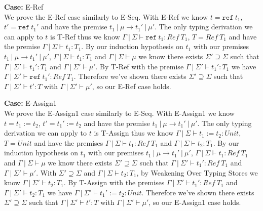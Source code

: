 \documentclass[12pt, fleqn]{article}
\begin{document}
\medskip
\textbf{Case:} E-Ref\\
We prove the E-Ref case similarly to E-Seq. With E-Ref we know $t = \texttt{ref}\:t_1$, $t' = \texttt{ref}\:t_1'$ and have the premise $t_1\:|\:\mu \rightarrow t_1'\:|\:\mu'$. The only typing derivation we can apply to $t$ is T-Ref thus we know $\Gamma\:|\:\Sigma \vdash \texttt{ref}\:t_1 : Ref \: T_1$, $T = Ref \: T_1$ and have the premise $\Gamma\:|\:\Sigma \vdash t_1 : T_1$. 
By our induction hypothesis on $t_1$ with our premises $t_1\:|\:\mu \rightarrow t_1'\:|\:\mu'$, $\Gamma\:|\: \Sigma \vdash t_1 : T_1$ and $\Gamma\:|\:\Sigma \vdash \mu$ we know there exists $\Sigma' \supseteq \Sigma$ such that $\Gamma\:|\:\Sigma' \vdash t_1' : T_1$ and $\Gamma\:|\:\Sigma' \vdash \mu'$. By T-Ref with the premise $\Gamma\:|\:\Sigma' \vdash t_1' : T_1$ we have $\Gamma\:|\:\Sigma' \vdash \texttt{ref}\:t_1' : Ref\:T_1$. Therefore we've shown there exists $\Sigma' \supseteq \Sigma$ such that $\Gamma\:|\:\Sigma' \vdash t' : T$ with $\Gamma\:|\:\Sigma' \vdash \mu'$, so our E-Ref case holds.

\medskip
\textbf{Case:} E-Assign1\\
We prove the E-Assign1 case similarly to E-Seq. With E-Assign1 we know $t = t_1 := t_2$, $t' = t_1' := t_2$ and have the premise $t_1\:|\:\mu \rightarrow t_1'\:|\:\mu'$. The only typing derivation we can apply to $t$ is T-Assign thus we know $\Gamma\:|\:\Sigma \vdash t_1 := t_2 : Unit$, $T = Unit$ and have the premises $\Gamma\:|\:\Sigma \vdash t_1 : Ref\:T_1$ and $\Gamma\:|\:\Sigma \vdash t_2 : T_1$. 
By our induction hypothesis on $t_1$ with our premises $t_1\:|\:\mu \rightarrow t_1'\:|\:\mu'$, $\Gamma\:|\: \Sigma \vdash t_1 : Ref\:T_1$ and $\Gamma\:|\:\Sigma \vdash \mu$ we know there exists $\Sigma' \supseteq \Sigma$ such that $\Gamma\:|\:\Sigma' \vdash t_1' : Ref\:T_1$ and $\Gamma\:|\:\Sigma' \vdash \mu'$.
With $\Sigma' \supseteq \Sigma$ and $\Gamma\:|\:\Sigma \vdash t_2 : T_1$, by Weakening Over Typing Stores we know $\Gamma\:|\:\Sigma' \vdash t_2 : T_1$. By T-Assign with the premises $\Gamma\:|\:\Sigma' \vdash t_1' : Ref\:T_1$ and $\Gamma\:|\:\Sigma' \vdash t_2 : T_1$ we have $\Gamma\:|\:\Sigma' \vdash t_1' := t_2 : Unit$. Therefore we've shown there exists $\Sigma' \supseteq \Sigma$ such that $\Gamma\:|\:\Sigma' \vdash t' : T$ with $\Gamma\:|\:\Sigma' \vdash \mu'$, so our E-Assign1 case holds.
\end{document}
